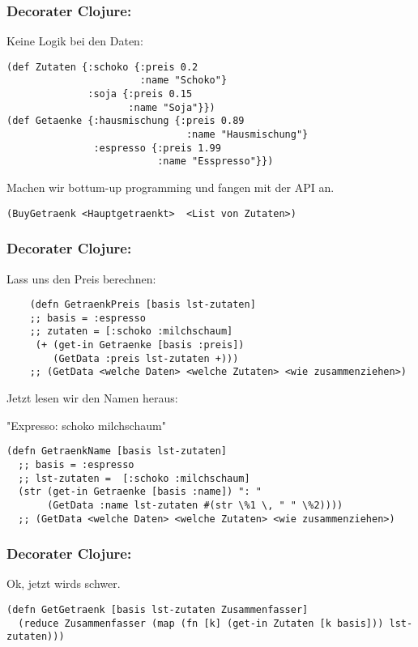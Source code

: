 \documentclass[compress, blue]{beamer}
\begin{document}
\begin{frame}[fragile]\frametitle{Decorater Clojure:}
Keine Logik bei den Daten:
 \begin{lstlisting}
(def Zutaten {:schoko {:preis 0.2
                       :name "Schoko"}
              :soja {:preis 0.15 
                     :name "Soja"}})
(def Getaenke {:hausmischung {:preis 0.89 
                               :name "Hausmischung"}
               :espresso {:preis 1.99 
                          :name "Esspresso"}})
 \end{lstlisting}
\pause

Machen wir bottum-up programming und fangen mit der API an.
\pause
\begin{lstlisting}
(BuyGetraenk <Hauptgetraenkt>  <List von Zutaten>)
\end{lstlisting}
\pause
\end{frame}

\begin{frame}[fragile]\frametitle{Decorater Clojure:}

Lass uns den Preis berechnen:

  \begin{lstlisting}
    (defn GetraenkPreis [basis lst-zutaten]
    ;; basis = :espresso
    ;; zutaten = [:schoko :milchschaum]
     (+ (get-in Getraenke [basis :preis])
        (GetData :preis lst-zutaten +)))
    ;; (GetData <welche Daten> <welche Zutaten> <wie zusammenziehen>)
  \end{lstlisting}
\pause

Jetzt lesen wir den Namen heraus:

"Expresso: schoko milchschaum"

  \begin{lstlisting}
(defn GetraenkName [basis lst-zutaten]
  ;; basis = :espresso
  ;; lst-zutaten =  [:schoko :milchschaum]
  (str (get-in Getraenke [basis :name]) ": "
       (GetData :name lst-zutaten #(str \%1 \, " " \%2))))
  ;; (GetData <welche Daten> <welche Zutaten> <wie zusammenziehen>)
  \end{lstlisting}
\pause

\end{frame}

\begin{frame}[fragiel]\frametitle{Decorater Clojure:}
  Ok, jetzt wirds schwer.

\begin{lstlisting}
(defn GetGetraenk [basis lst-zutaten Zusammenfasser]
  (reduce Zusammenfasser (map (fn [k] (get-in Zutaten [k basis])) lst-zutaten)))  
\end{lstlisting}
\pause
\end{frame}
\end{document}
